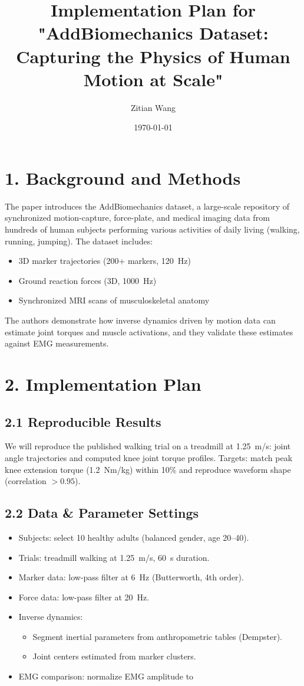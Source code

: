 \documentclass[11pt]{article}
\title{Implementation Plan for "AddBiomechanics Dataset: Capturing the Physics of Human Motion at Scale"}
\author{Zitian Wang}
\date{\today}
\begin{document}
\maketitle

\section*{1. Background and Methods}
The paper introduces the AddBiomechanics dataset, a large-scale repository of synchronized motion-capture, force-plate, and medical imaging data from hundreds of human subjects performing various activities of daily living (walking, running, jumping).  The dataset includes:
\begin{itemize}
  \item 3D marker trajectories (200+ markers, 120~Hz)
  \item Ground reaction forces (3D, 1000~Hz)
  \item Synchronized MRI scans of musculoskeletal anatomy
\end{itemize}
The authors demonstrate how inverse dynamics driven by motion data can estimate joint torques and muscle activations, and they validate these estimates against EMG measurements.

\section*{2. Implementation Plan}
\subsection*{2.1 Reproducible Results}
We will reproduce the published walking trial on a treadmill at 1.25~m/s: joint angle trajectories and computed knee joint torque profiles.  Targets: match peak knee extension torque (\SI{1.2}{Nm/kg}) within 10\% and reproduce waveform shape (correlation $>0.95$).

\subsection*{2.2 Data \& Parameter Settings}
\begin{itemize}
  \item Subjects: select 10 healthy adults (balanced gender, age 20--40).
  \item Trials: treadmill walking at 1.25~m/s, 60~s duration.
  \item Marker data: low-pass filter at 6~Hz (Butterworth, 4th order).
  \item Force data: low-pass filter at 20~Hz.
  \item Inverse dynamics:
    \begin{itemize}
      \item Segment inertial parameters from anthropometric tables (Dempster).
      \item Joint centers estimated from marker clusters.
    \end{itemize}
  \item EMG comparison: normalize EMG amplitude to %
\end{itemize}
\end{document}
